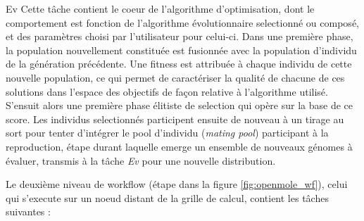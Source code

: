 \begin{myitemize}
\item[Ev] Cette tâche contient le coeur de l'algorithme d'optimisation, dont le comportement est fonction de l'algorithme évolutionnaire selectionné ou composé, et des paramètres choisi par l'utilisateur pour celui-ci. Dans une première phase, la population nouvellement constituée est fusionnée avec la population d'individu de la génération précédente. Une fitness est attribuée à chaque individu de cette nouvelle population, ce qui permet de caractériser la qualité de chacune de ces solutions dans l'espace des objectifs de façon relative à l'algorithme utilisé. S'ensuit alors une première phase élitiste de selection qui opère sur la base de ce score. Les individus selectionnés participent ensuite de nouveau à un tirage au sort pour tenter d'intégrer le pool d'individu (\textit{mating pool}) participant à la reproduction, étape durant laquelle emerge un ensemble de nouveaux génomes à évaluer, transmis à la tâche \textit{Ev} pour une nouvelle distribution.
\end{myitemize}

Le deuxième niveau de workflow (étape  dans la figure \ref{fig:openmole_wf}), celui qui s'execute sur un noeud distant de la grille de calcul, contient les tâches suivantes :

